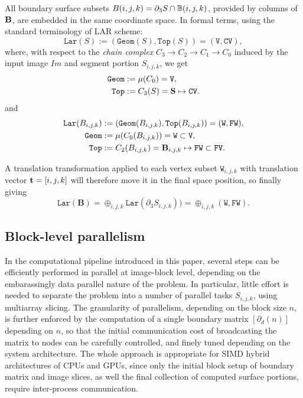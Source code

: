 \documentclass[11pt, oneside]{amsart}   	%
\begin{document}
All boundary surface subsets $B(i,j,k) = \partial_3 S \cap \mathbb{B}(i,j,k)$, provided by  columns of ${\bf B}$, are embedded in the same coordinate space. In formal terms, using the standard terminology of LAR scheme: 
\[
\texttt{Lar}(S) := (\texttt{Geom}(S), \texttt{Top}(S)) = (\texttt{V}, \texttt{CV}),
\]
where, with respect to the \emph{chain complex} $C_3\to C_2\to C_1\to C_0$ induced by the input image $Im$ and segment portion $S_{i,j,k}$, we get
\begin{align}
\texttt{Geom} &:= \mu(C_0) = \texttt{V},
\\
\texttt{Top} &:= C_3(S) = {\bf S} \mapsto \texttt{CV}.
\end{align}
and
\begin{align}
\texttt{Lar}(B_{i,j,k}) &:= (\texttt{Geom}(B_{i,j,k}), \texttt{Top}(B_{i,j,k})) = (\texttt{W}, \texttt{FW}),
\\
\texttt{Geom} &:= \mu(C_0(B_{i,j,k})) = \texttt{W} \subset \texttt{V},
\\
\texttt{Top} &:= C_2(B_{i,j,k}) = {\bf \textbf{B}}_{i,j,k} \mapsto \texttt{FW} \subset \texttt{FV}.
\end{align}


A translation transformation applied to each vertex subset $\texttt{W}_{i,j,k}$ with translation  vector ${\bf t} = [i,j,k]$ will therefore move it in the final space position, so finally giving
\[
\texttt{Lar}(\textbf{B}) = \oplus_{i,j,k}\texttt{Lar}(\partial_3 S_{i,j,k})) = \oplus_{i,j,k}(\texttt{W}, \texttt{FW}) .
\]


\subsection{Block-level parallelism}\label{sec:block-parallelism}

In the computational pipeline introduced in this paper, several steps can be efficiently performed in parallel at image-block level, depending on the embarassingly data parallel nature of the problem. In particular, little effort is needed to separate the problem into a number of parallel tasks $S_{i,j,k}$, using multiarray slicing. The granularity of parallelism, depending on the block size $n$, is further enforced by the computation of a single boundary matrix $[\partial_d(n)]$ depending on $n$, so that the initial communication cost of broadcasting the matrix to nodes can be carefully controlled, and finely tuned depending on the system architecture. The whole approach is appropriate  for SIMD hybrid architectures of CPUs and GPUs, since only the initial block setup of boundary matrix and image slices, as well the final collection of computed surface portions, require inter-process communication.
\end{document}
